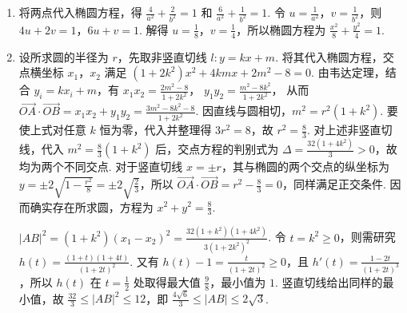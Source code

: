 \begin{solution}
\begin{enumerate}
\item 将两点代入椭圆方程，得 \(\frac4{a^2}+\frac2{b^2}=1\) 和 \(\frac6{a^2}+\frac1{b^2}=1\). 令 \(u=\frac1{a^2}\)，\(v=\frac1{b^2}\)，则 \(4u+2v=1\)，\(6u+v=1\). 解得 \(u=\frac18\)，\(v=\frac14\)，所以椭圆方程为 \(\displaystyle \frac{x^2}{8}+\frac{y^2}{4}=1\).
\item 设所求圆的半径为 \(r\)，先取非竖直切线 \(l:y=kx+m\). 将其代入椭圆方程，交点横坐标 \(x_1\)，\(x_2\) 满足 \(\displaystyle (1+2k^2)x^2+4kmx+2m^2-8=0\). 由韦达定理，结合 \(y_i=kx_i+m\)，有
\(\displaystyle x_1x_2=\frac{2m^2-8}{1+2k^2}\)，
\(\displaystyle y_1y_2=\frac{m^2-8k^2}{1+2k^2}\)，
从而
\(\displaystyle \overrightarrow{OA}\cdot\overrightarrow{OB}=x_1x_2+y_1y_2=\frac{3m^2-8k^2-8}{1+2k^2}\).
因直线与圆相切，\(m^2=r^2(1+k^2)\). 要使上式对任意 \(k\) 恒为零，代入并整理得 \(3r^2=8\)，故 \(r^2=\frac83\). 对上述非竖直切线，代入 \(m^2=\frac83(1+k^2)\) 后，交点方程的判别式为 \(\displaystyle \Delta=\frac{32(1+4k^2)}{3}>0\)，故均为两个不同交点. 对于竖直切线 \(x=\pm r\)，其与椭圆的两个交点的纵坐标为 \(y=\pm2\sqrt{1-\frac{r^2}{8}}=\pm2\sqrt{\frac23}\)，所以 \(\overrightarrow{OA}\cdot\overrightarrow{OB}=r^2-\frac83=0\)，同样满足正交条件. 因而确实存在所求圆，方程为 \(x^2+y^2=\frac83\).

\(\displaystyle |AB|^2=(1+k^2)(x_1-x_2)^2=\frac{32(1+k^2)(1+4k^2)}{3(1+2k^2)^2}\). 令 \(t=k^2\geqslant0\)，则需研究 \(\displaystyle h(t)=\frac{(1+t)(1+4t)}{(1+2t)^2}\). 又有 \(\displaystyle h(t)-1=\frac{t}{(1+2t)^2}\geqslant0\)，且
\(\displaystyle h'(t)=\frac{1-2t}{(1+2t)^3}\)，所以 \(h(t)\) 在 \(t=\frac12\) 处取得最大值 \(\frac98\)，最小值为 \(1\). 竖直切线给出同样的最小值，故
\(\displaystyle \frac{32}{3}\leqslant|AB|^2\leqslant12\)，即 \(\displaystyle \frac{4\sqrt6}{3}\leqslant|AB|\leqslant2\sqrt3\).
\end{enumerate}
\end{solution}
